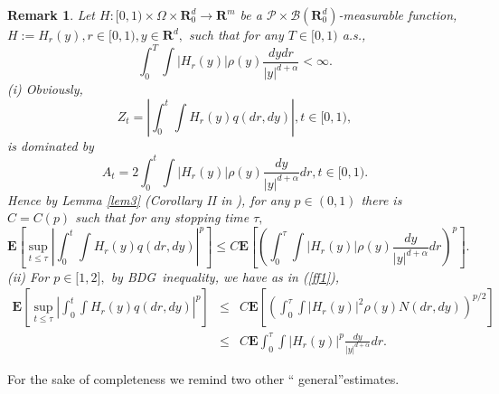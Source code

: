 \documentclass[11pt]{amsart}
\theoremstyle{plain}
\newtheorem{remark}{Remark}
\numberwithin{equation}{section}
\begin{document}
\begin{remark}
\label{re2}Let $H:[0,1)\times \Omega \times \mathbf{R}_{0}^{d}\rightarrow 
\mathbf{R}^{m}$ be a $\mathcal{P\times B}\left( \mathbf{R}_{0}^{d}\right) $-measurable function, $H:=H_{r}\left( y\right) ,r\in \lbrack 0,1),y\in 
\mathbf{R}^{d},$ such that for any $T\in \lbrack 0,1)$ a.s.,\begin{equation*}
\int_{0}^{T}\int \left\vert H_{r}\left( y\right) \right\vert \rho \left(
y\right) \frac{dydr}{\left\vert y\right\vert ^{d+\alpha }}<\infty .
\end{equation*}(i) Obviously, 
\begin{equation*}
Z_{t}=\left\vert \int_{0}^{t}\int H_{r}\left( y\right) q\left( dr,dy\right)
\right\vert ,t\in \lbrack 0,1),
\end{equation*}is dominated by\begin{equation*}
A_{t}=2\int_{0}^{t}\int \left\vert H_{r}\left( y\right) \right\vert \rho
\left( y\right) \frac{dy}{\left\vert y\right\vert ^{d+\alpha }}dr,t\in
\lbrack 0,1).
\end{equation*}Hence by Lemma \ref{lem3} (Corollary II in \cite{le}), for any $p\in \left(
0,1\right) $ there is $C=C\left( p\right) $ such that for any stopping time $\tau ,$\begin{equation*}
\mathbf{E}\left[ \sup_{t\leq \tau }\left\vert \int_{0}^{t}\int H_{r}\left(
y\right) q\left( dr,dy\right) \right\vert ^{p}\right] \leq C\mathbf{E}\left[
\left( \int_{0}^{\tau }\int \left\vert H_{r}\left( y\right) \right\vert \rho
\left( y\right) \frac{dy}{\left\vert y\right\vert ^{d+\alpha }}dr\right) ^{p}\right] .
\end{equation*}(ii) For $p\in \lbrack 1,2],$ by BDG\ inequality, we have as in (\ref{ff1}),\begin{eqnarray*}
\mathbf{E}\left[ \sup_{t\leq \tau }\left\vert \int_{0}^{t}\int H_{r}\left(
y\right) q\left( dr,dy\right) \right\vert ^{p}\right] &\leq &C\mathbf{E}\left[ \left( \int_{0}^{\tau }\int \left\vert H_{r}\left( y\right)
\right\vert ^{2}\rho \left( y\right) N\left( dr,dy\right) \right) ^{p/2}\right] \\
&\leq &C\mathbf{E}\int_{0}^{\tau }\int \left\vert H_{r}\left( y\right)
\right\vert ^{p}\frac{dy}{\left\vert y\right\vert ^{d+\alpha }}dr.
\end{eqnarray*}
\end{remark}

For the sake of completeness we remind two other \textquotedblleft
general\textquotedblright estimates.
\end{document}
